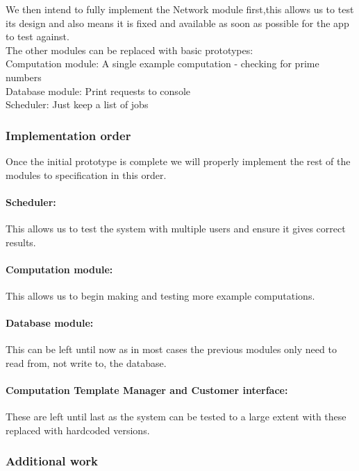 \documentclass[
  twoside,
  10pt, a4paper
]{article}
\begin{document}
We then intend to fully implement the Network module first,this allows us to test its design and also means it is fixed and available as soon as possible for the app to test against.\\

The other modules can be replaced with basic prototypes:\\
Computation module: A single example computation - checking for prime numbers\\
Database module: Print requests to console\\
Scheduler: Just keep a list of jobs\\


\subsubsection{Implementation order}

Once the initial prototype is complete we will properly implement the rest of the modules to specification in this order.

\paragraph{Scheduler:} This allows us to test the system with multiple users and ensure it gives correct results.

\paragraph{Computation module:} This allows us to begin making and testing more example computations.

\paragraph{Database module:} This can be left until now as in most cases the previous modules only need to read from, not write to, the database.

\paragraph{Computation Template Manager and Customer interface:} These are left until last as the system can be tested to a large extent with these replaced with hardcoded versions.


\subsubsection{Additional work}
\end{document}
